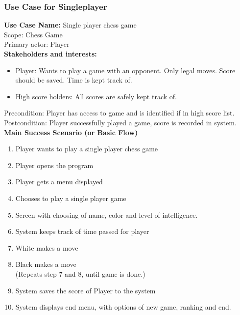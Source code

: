 \documentclass{article}
\begin{document}
\begin{flushleft}
\newpage

\subsubsection{Use Case for Singleplayer}
\textbf {Use Case Name:} Single player chess game\\
\vspace{1mm}
Scope: Chess Game\\
\vspace{1mm}
Primary actor: Player\\
\vspace{1mm}
\textbf{Stakeholders and interests:}\\

\begin{itemize}	
	\item Player: Wants to play a game with an opponent. Only legal moves. Score should be saved. Time is kept track of.\\	
	\item High score holders: All scores are safely kept track of.	
\end{itemize}

	Precondition: Player has access to game and is identified if in high score list.\\
	\vspace{1mm}
	Postcondition: Player successfully played a game, score is recorded in system.\\
	\vspace{2mm}
	\textbf{Main Success Scenario (or Basic Flow)}\\

\begin{enumerate}	
\item Player wants to play a single player chess game
\item Player opens the program
\item Player gets a menu displayed
\item Chooses to play a single player game
\item Screen with choosing of name, color and level of intelligence.
\item System keeps track of time passed for player
\item White makes a move
\item Black makes a move\\
(Repeats step 7 and 8, until game is done.)
\item System saves the score of Player to the system
\item System displays end menu, with options of new game, ranking and end.
\end{enumerate}


\end{flushleft}
\end{document}
